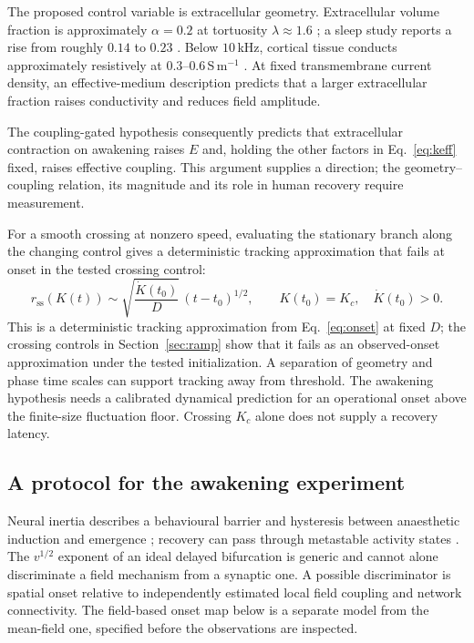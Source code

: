 \documentclass[12pt]{article}
\renewcommand{\cite}[1]{\citep{#1}}
\begin{document}
The proposed control variable is extracellular geometry. Extracellular volume fraction is approximately $\alpha=0.2$ at tortuosity $\lambda\approx1.6$ \cite{sykova2008}; a sleep study reports a rise from roughly $0.14$ to $0.23$ \cite{xie2013}. Below $10$\,kHz, cortical tissue conducts approximately resistively at $0.3$--$0.6$\,S\,m$^{-1}$ \cite{barbour2017}. At fixed transmembrane current density, an effective-medium description predicts that a larger extracellular fraction raises conductivity and reduces field amplitude.

The coupling-gated hypothesis consequently predicts that extracellular contraction on awakening raises $E$ and, holding the other factors in Eq.~\eqref{eq:keff} fixed, raises effective coupling. This argument supplies a direction; the geometry--coupling relation, its magnitude and its role in human recovery require measurement.

For a smooth crossing at nonzero speed, evaluating the stationary branch along the changing control gives a deterministic tracking approximation that fails at onset in the tested crossing control:
\begin{equation}
 r_{\mathrm{ss}}(K(t))\sim\sqrt{\frac{\dot K(t_0)}{D}}\,(t-t_0)^{1/2},
 \qquad K(t_0)=K_c,\quad \dot K(t_0)>0.
 \label{eq:recovery}
\end{equation}
This is a deterministic tracking approximation from Eq.~\eqref{eq:onset} at fixed $D$; the crossing controls in Section~\ref{sec:ramp} show that it fails as an observed-onset approximation under the tested initialization. A separation of geometry and phase time scales can support tracking away from threshold. The awakening hypothesis needs a calibrated dynamical prediction for an operational onset above the finite-size fluctuation floor. Crossing $K_c$ alone does not supply a recovery latency.

\subsection{A protocol for the awakening experiment}
\label{sec:protocol}

Neural inertia describes a behavioural barrier and hysteresis between anaesthetic induction and emergence \cite{friedman2010}; recovery can pass through metastable activity states \cite{hudson2014,proekt2018}. The $v^{1/2}$ exponent of an ideal delayed bifurcation is generic \cite{baer1989,berglund2002} and cannot alone discriminate a field mechanism from a synaptic one. A possible discriminator is spatial onset relative to independently estimated local field coupling and network connectivity. The field-based onset map below is a separate model from the mean-field one, specified before the observations are inspected.
\end{document}
